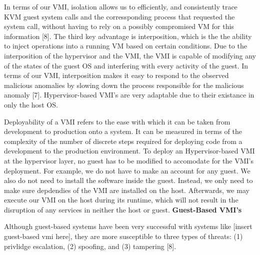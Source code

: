 \documentclass{report}
\begin{document}
\begin{spacing}{1.5}
{\large
In terms of our VMI, isolation allows us to efficiently, and consistently trace KVM guest system calls and the corressponding process that requested the system call, without having to rely on a possibly compromised VM for this information [8]. The third key advantage is interposition, which is the the ability to inject operations into a running VM based on certain conditions. Due to the interposition of the hypervisor and the VMI, the VMI is capable of modifying any of the states of the guest OS and interfering with every activity of the guest. In terms of our VMI, interposition makes it easy to respond to the observed malicious anomalies by slowing down the process responsible for the malicious anomaly [7]. Hypervisor-based VMI's are very adaptable due to their existance in only the host OS. 
\newline
}


{\large
Deployability of a VMI refers to the ease with which it can be taken from development to production onto a system. It can be measured in terms of the complexity of the number of discrete steps required for deploying code from a development to the production environment. To deploy an Hypervisor-based VMI at the hypervisor layer, no guest has to be modified to accomodate for the VMI's deployment. For example, we do not have to make an account for any guest. We also do not need to install the software inside the guest. Instead, we only need to make sure depdendies of the VMI are installed on the host. Afterwards, we may execute our VMI on the host during its runtime, which will not result in the disruption of any services in neither the host or guest.
\newline \newline
\textbf{Guest-Based VMI's}
\newline
}


{\large
Although guest-based systems have been very successful with systems like [insert guest-based vmi here], they are more susceptible to three types of threats: (1) privlidge escalation, (2) spoofing, and (3) tampering [8]. 
\newline
}


\end{spacing}
\end{document}
